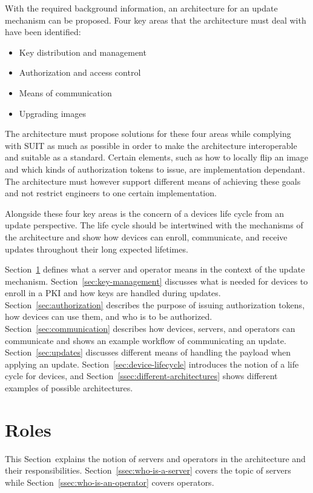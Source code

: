 \documentclass[0-thesis.tex]{subfiles}
\begin{document}
With the required background information, an architecture for an update mechanism can be
proposed. Four key areas that the architecture must deal with have been identified:

\begin{itemize}
    \item Key distribution and management
    \item Authorization and access control
    \item Means of communication
    \item Upgrading images
\end{itemize}

The architecture must propose solutions for these four areas while complying with SUIT as
much as possible in order to make the architecture interoperable and suitable as a
standard. Certain elements, such as how to locally flip an image and which kinds of
authorization tokens to issue, are implementation dependant. The architecture must however
support different means of achieving these goals and not restrict engineers to one certain
implementation.

Alongside these four key areas is the concern of a devices life cycle from an update
perspective. The life cycle should be intertwined with the mechanisms of the architecture
and show how devices can enroll, communicate, and receive updates throughout their long
expected lifetimes. 

Section~\ref{sec:roles} defines what a server and operator means in the context of the
update mechanism. Section~\ref{sec:key-management} discusses what is needed for devices to
enroll in a PKI and how keys are handled during updates. Section~\ref{sec:authorization}
describes the purpose of issuing authorization tokens, how devices can use them, and who
is to be authorized. Section~\ref{sec:communication} describes how devices, servers, and
operators can communicate and shows an example workflow of communicating an update.
Section~\ref{sec:updates} discusses different means of handling the payload when applying
an update. Section~\ref{sec:device-lifecycle} introduces the notion of a life cycle for
devices, and Section~\ref{ssec:different-architectures} shows different examples of
possible architectures.

\section{Roles}
\label{sec:roles}
This Section~explains the notion of servers and operators in the architecture and their
responsibilities. Section~\ref{ssec:who-is-a-server} covers the topic of servers while
Section~\ref{ssec:who-is-an-operator} covers operators.
\end{document}
